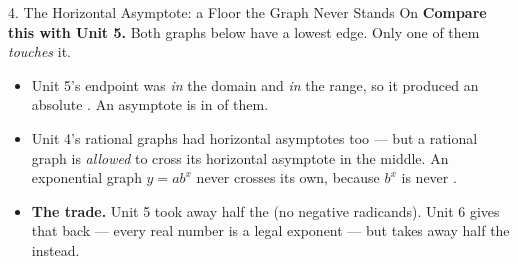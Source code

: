 \documentclass[10pt]{article}
\newcommand{\lgrid}[4]{%
  \draw[step=1, linegray!40, very thin] (#1,#3) grid (#2,#4);
  \draw[->, semithick, charcoal] (#1,0)--(#2,0) node[below right, font=\scriptsize]{$x$};
  \draw[->, semithick, charcoal] (0,#3)--(0,#4) node[left, font=\scriptsize]{$y$};}
\newcommand{\expcurve}[4]{\draw[very thick, forest, domain=#3:#4, samples=120, smooth]
  plot (\x,{#1*exp((#2)*(\x))});}
\begin{document}
\begin{notesbox}{4. The Horizontal Asymptote: a Floor the Graph Never Stands On}
\vspace{3pt}
\textbf{Compare this with Unit 5.} Both graphs below have a lowest edge. Only one of them
\emph{touches} it.
\begin{center}
\end{center}
\begin{itemize}[leftmargin=1.5em, itemsep=3pt]
  \item Unit 5's endpoint was \emph{in} the domain and \emph{in} the range, so it produced an
        absolute \blank{1.8cm}. An asymptote is in \blank{2.0cm} of them.
  \item Unit 4's rational graphs had horizontal asymptotes too --- but a rational graph is
        \emph{allowed} to cross its horizontal asymptote in the middle. An exponential graph
        $y=ab^{x}$ never crosses its own, because $b^{x}$ is never \blank{1.4cm}.
  \item \textbf{The trade.} Unit 5 took away half the \blank{2.0cm} (no negative radicands). Unit 6
        gives that back --- every real number is a legal exponent --- but takes away half the
        \blank{2.0cm} instead.
\end{itemize}
\end{notesbox}
\end{document}

